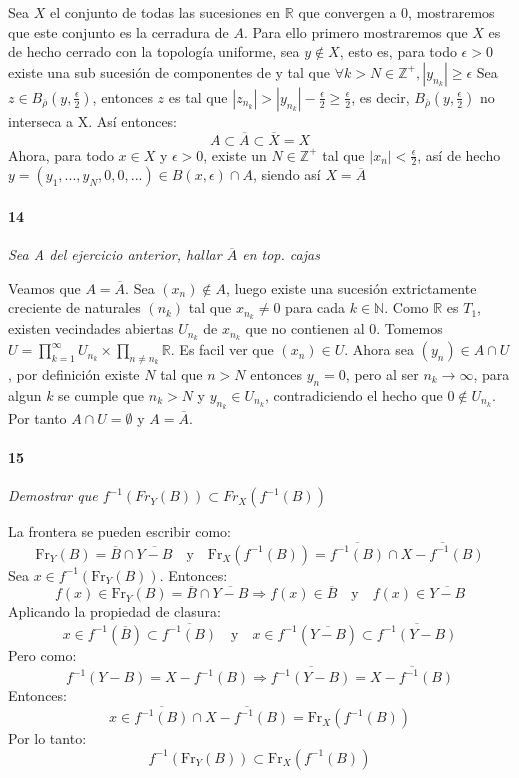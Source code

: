 \documentclass[12pt]{article}
\begin{document}
Sea $X$ el conjunto de todas las sucesiones en $\mathbb{R}$ que convergen a 0, mostraremos que este conjunto es la cerradura de $A$.
Para ello primero mostraremos que $X$ es de hecho cerrado con la topología uniforme, sea $y \notin X$, esto es, para todo $\epsilon >0$ existe una sub sucesión de componentes de y tal que $\forall k > N \in \mathbb{Z^{+}}, |y_{n_{k}}| \geq \epsilon$ 
Sea $z \in B_{\overline{\rho}}(y, \frac{\epsilon}{2})$, entonces $z$ es tal que $|z_{n_{k}}| > |y_{n_{k}}| - \frac{\epsilon}{2} \geq \frac{\epsilon}{2}$, es decir, $B_{\overline{\rho}}(y, \frac{\epsilon}{2})$ no interseca a X. Así entonces:
\begin{equation}
    A \subset \overline{A} \subset \overline{X} = X
\end{equation}
Ahora, para todo $x \in X$ y $\epsilon >0$, existe un $N \in \mathbb{Z^{+}}$ tal que $|x_{n}| < \frac{\epsilon}{2}$, así de hecho $y = (y_{1}, ..., y_{N}, 0, 0, ...) \in B(x, \epsilon) \cap A$, siendo así $X = \overline{A}$ 

\paragraph{14}
\textit{Sea A del ejercicio anterior, hallar $\overline{A}$ en top. cajas}

Veamos que $A=\overline{A}$. Sea $(x_n) \notin A$, luego existe una sucesión extrictamente creciente de naturales $(n_k)$ tal que $x_{n_k} \neq 0$ para cada $k \in \mathbb{N}$. Como $\mathbb{R}$ es $T_1$, existen vecindades abiertas $U_{n_k}$ de $x_{n_k}$ que no contienen al $0$.
Tomemos $U=\prod_{k=1}^{\infty}U_{n_k} \times \prod_{n \neq n_k} \mathbb{R}$. Es facil ver que $(x_n) \in U$. Ahora sea $(y_n) \in A \cap U$, por definición existe $N$ tal que $n>N$ entonces $y_n=0$, pero al ser $n_k \to \infty$, para algun $k$ se cumple que
$n_k>N$ y $y_{n_k} \in U_{n_k}$, contradiciendo el hecho que $0 \notin U_{n_k}$. Por tanto $A \cap U = \emptyset$ y $A=\overline{A}$.
\paragraph{15}
\textit{Demostrar que $f^{-1}(Fr_Y(B))\subset Fr_X(f^{-1}(B))$}

La frontera se pueden escribir como:
\[
\mathrm{Fr}_Y(B) = \overline{B} \cap \overline{Y - B}
\quad \text{y} \quad
\mathrm{Fr}_X(f^{-1}(B)) = \overline{f^{-1}(B)} \cap \overline{X - f^{-1}(B)}
\]
Sea \( x \in f^{-1}(\mathrm{Fr}_Y(B)) \).  
Entonces:
\[
f(x) \in \mathrm{Fr}_Y(B) = \overline{B} \cap \overline{Y - B}
\Rightarrow
f(x) \in \overline{B} \quad \text{y} \quad f(x) \in \overline{Y - B}
\]
Aplicando la propiedad de clasura:
\[
x \in f^{-1}(\overline{B}) \subset \overline{f^{-1}(B)}
\quad \text{y} \quad
x \in f^{-1}(\overline{Y - B}) \subset \overline{f^{-1}(Y - B)}
\]
Pero como:
\[
f^{-1}(Y - B) = X - f^{-1}(B)
\Rightarrow
\overline{f^{-1}(Y - B)} = \overline{X - f^{-1}(B)}
\]
Entonces:
\[
x \in \overline{f^{-1}(B)} \cap \overline{X - f^{-1}(B)} = \mathrm{Fr}_X(f^{-1}(B))
\]
Por lo tanto:
\[
f^{-1}(\mathrm{Fr}_Y(B)) \subset \mathrm{Fr}_X(f^{-1}(B))
\]
\end{document}

